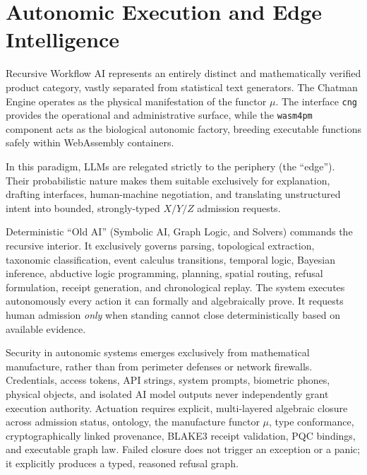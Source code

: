 \section{Autonomic Execution and Edge Intelligence}

Recursive Workflow AI represents an entirely distinct and mathematically verified product category, vastly separated from statistical text generators. The Chatman Engine operates as the physical manifestation of the functor $\mu$. The interface \texttt{cng} provides the operational and administrative surface, while the \texttt{wasm4pm} component acts as the biological autonomic factory, breeding executable functions safely within WebAssembly containers.

In this paradigm, LLMs are relegated strictly to the periphery (the ``edge''). Their probabilistic nature makes them suitable exclusively for explanation, drafting interfaces, human-machine negotiation, and translating unstructured intent into bounded, strongly-typed $X/Y/Z$ admission requests. 

Deterministic ``Old AI'' (Symbolic AI, Graph Logic, and Solvers) commands the recursive interior. It exclusively governs parsing, topological extraction, taxonomic classification, event calculus transitions, temporal logic, Bayesian inference, abductive logic programming, planning, spatial routing, refusal formulation, receipt generation, and chronological replay. The system executes autonomously every action it can formally and algebraically prove. It requests human admission \textit{only} when standing cannot close deterministically based on available evidence.

\begin{lemma}
Security in autonomic systems emerges exclusively from mathematical manufacture, rather than from perimeter defenses or network firewalls. Credentials, access tokens, API strings, system prompts, biometric phones, physical objects, and isolated AI model outputs never independently grant execution authority. Actuation requires explicit, multi-layered algebraic closure across admission status, ontology, the manufacture functor $\mu$, type conformance, cryptographically linked provenance, BLAKE3 receipt validation, PQC bindings, and executable graph law. Failed closure does not trigger an exception or a panic; it explicitly produces a typed, reasoned refusal graph.
\end{lemma}

